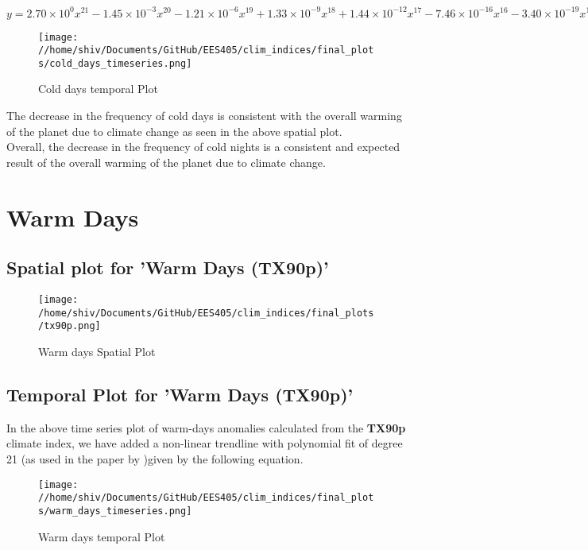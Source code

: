 \documentclass[a4paper, 12pt, twoside]{report}
\begin{document}
$ y = 2.70 \times 10^{0}x^{21} - 1.45 \times 10^{-3}x^{20} - 1.21 \times 10^{-6}x^{19} + 1.33 \times 10^{-9}x^{18} + 1.44 \times 10^{-12}x^{17} - 7.46 \times 10^{-16}x^{16} - 3.40 \times 10^{-19}x^{15} + 2.25 \times 10^{-22}x^{14} - 5.15 \times 10^{-28}x^{13} - 2.44 \times 10^{-29}x^{12} + 6.13 \times 10^{-33}x^{11} - 7.94 \times 10^{-39}x^{10} - 3.03 \times 10^{-40}x^{9} + 7.96 \times 10^{-44}x^{8} - 1.16 \times 10^{-47}x^{7} + 1.12 \times 10^{-51}x^{6} - 7.65 \times 10^{-56}x^{5} + 3.69 \times 10^{-60}x^{4} - 1.24 \times 10^{-64}x^{3} + 2.79 \times 10^{-69}x^{2} - 3.75 \times 10^{-74}x^{1} + 2.29 \times 10^{-79}
$

\begin{figure}[htb]
    \centering
    \texttt{[image: //home/shiv/Documents/GitHub/EES405/clim\_indices/final\_plots/cold\_days\_timeseries.png]}
    \caption{Cold days temporal Plot}
    \label{fig:cold_days_temporal}
\end{figure}

The decrease in the frequency of cold days is consistent with the overall warming of the planet due to climate change as seen in the above spatial plot.\\
Overall, the decrease in the frequency of cold nights is a consistent and expected result of the overall warming of the planet due to climate change.

\section{Warm Days}
\newpage
\subsection{Spatial plot for 'Warm Days (TX90p)'}

\begin{figure}[htb]
    \centering
    \texttt{[image: /home/shiv/Documents/GitHub/EES405/clim\_indices/final\_plots/tx90p.png]}
    \caption{Warm days Spatial Plot}
    \label{fig:warm_days_spatial}
\end{figure}

\subsection{Temporal Plot for 'Warm Days (TX90p)'}
In the above time series plot of warm-days anomalies calculated from the \textbf{TX90p} climate index, we have added a non-linear trendline with polynomial fit of degree 21 (as used in the paper by )given by the following equation. \\
\begin{figure}[htb]
    \centering
    \texttt{[image: //home/shiv/Documents/GitHub/EES405/clim\_indices/final\_plots/warm\_days\_timeseries.png]}
    \caption{Warm days temporal Plot}
    \label{fig:warm_days_temporal}
\end{figure}
\end{document}
